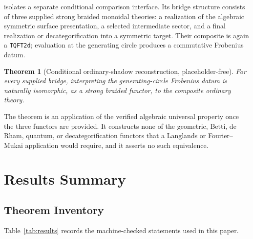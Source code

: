 \documentclass[11pt]{amsart}
\theoremstyle{plain}
\newtheorem{theorem}{Theorem}[section]
\theoremstyle{definition}
\begin{document}
 isolates a separate conditional comparison interface. Its bridge structure consists of three supplied strong braided monoidal theories: a realization of the algebraic symmetric surface presentation, a selected intermediate sector, and a final realization or decategorification into a symmetric target. Their composite is again a \texttt{TQFT2d}; evaluation at the generating circle produces a commutative Frobenius datum.

\begin{theorem}[Conditional ordinary-shadow reconstruction, placeholder-free]
For every supplied bridge, interpreting the generating-circle Frobenius datum is naturally isomorphic, as a strong braided functor, to the composite ordinary theory.
\end{theorem}

The theorem is an application of the verified algebraic universal property once the three functors are provided. It constructs none of the geometric, Betti, de Rham, quantum, or decategorification functors that a Langlands or Fourier--Mukai application would require, and it asserts no such equivalence.

\section{Results Summary}
\label{sec:results}

\subsection{Theorem Inventory}

Table~\ref{tab:results} records the machine-checked statements used in this paper.
\end{document}
